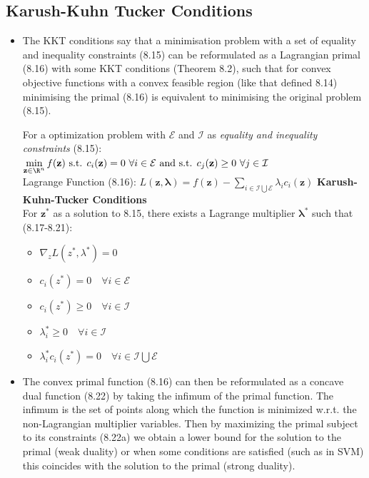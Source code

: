 \documentclass[english]{latex4ei/latex4ei_sheet}
\begin{document}
\begin{sectionbox}
\subsection{Karush-Kuhn Tucker Conditions}
\begin{itemize}
\item The KKT conditions say that a minimisation problem with a set of equality and inequality constraints (8.15) can be reformulated as a Lagrangian primal (8.16) with some KKT conditions (Theorem 8.2), such that for convex objective functions with a convex feasible region (like that defined 8.14) minimising the primal (8.16) is equivalent to minimising the original problem (8.15).
\begin{emphbox}
    For a optimization problem with $\mathcal{E}$ and $\mathcal{I}$ as \emph{equality and inequality constraints} (8.15):\\
    $\min\limits_{\mathbf{z}\in\R^n}f(\mathbf{z}) \ \mbox{s.t. } c_i(\mathbf{z}) = 0 \ \forall i\in\mathcal{E} \ \mbox{and s.t. } c_j(\mathbf{z}) \ge 0 \ \forall j\in\mathcal{I}$\\
    Lagrange Function (8.16): $L(\mathbf{z,\lambda})=f(\mathbf{z})-\sum\limits_{i\in\mathcal{I}\bigcup\mathcal{E}}\lambda_ic_i(\mathbf{z})$
    \textbf{Karush-Kuhn-Tucker Conditions}\\
    For $\mathbf{z^*}$ as a solution to 8.15, there exists a Lagrange multiplier $\mathbf{\lambda^*}$ such that (8.17-8.21):\\
    \begin{itemize}
        \item $\nabla_zL(z^*,\lambda^*)=0$
        \item $c_i(z^*)=0 \quad \forall i\in\mathcal{E}$
        \item $c_i(z^*)\ge0 \quad \forall i \in\mathcal{I}$
        \item $\lambda_i^* \ge0 \quad \forall i\in\mathcal{I}$
        \item $\lambda_i^*c_i(z^*)=0 \quad \forall i\in\mathcal{I}\bigcup\mathcal{E}$
    \end{itemize}
\end{emphbox}
\item The convex primal function (8.16) can then be reformulated as a concave dual function (8.22) by taking the infimum of the primal function. The infimum is the set of points along which the function is minimized w.r.t. the non-Lagrangian multiplier variables. Then by maximizing the primal subject to its constraints (8.22a) we obtain a lower bound for the solution to the primal (weak duality) or when some conditions are satisfied (such as in SVM) this coincides with the solution to the primal (strong duality).
\end{itemize}


\end{sectionbox}
\end{document}
